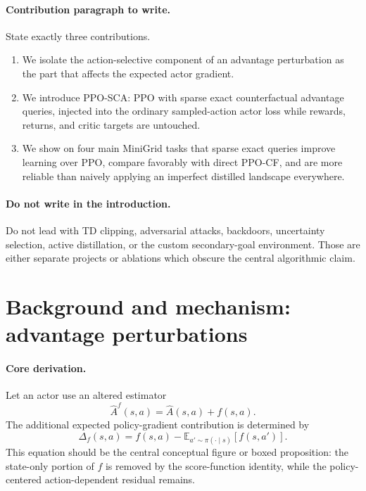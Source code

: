 \documentclass[11pt]{article}
\newcommand{\ppocf}{\textsc{PPO-CF}}
\newcommand{\pposca}{\textsc{PPO-SCA}}
\begin{document}
\paragraph{Contribution paragraph to write.}
State exactly three contributions.
\begin{enumerate}[leftmargin=1.6em]
  \item We isolate the action-selective component of an advantage perturbation
  as the part that affects the expected actor gradient.
  \item We introduce \pposca{}: PPO with sparse exact counterfactual advantage
  queries, injected into the ordinary sampled-action actor loss while rewards,
  returns, and critic targets are untouched.
  \item We show on four main MiniGrid tasks that sparse exact queries improve
  learning over PPO, compare favorably with direct \ppocf{}, and are more
  reliable than naively applying an imperfect distilled landscape everywhere.
\end{enumerate}

\paragraph{Do not write in the introduction.}
Do not lead with TD clipping, adversarial attacks, backdoors, uncertainty
selection, active distillation, or the custom secondary-goal environment.
Those are either separate projects or ablations which obscure the central
algorithmic claim.

\section{Background and mechanism: advantage perturbations}
\label{sec:mechanism}

\paragraph{Core derivation.}
Let an actor use an altered estimator
\begin{equation}
  \widehat A^f(s,a) = \widehat A(s,a) + f(s,a).
\end{equation}
The additional expected policy-gradient contribution is determined by
\begin{equation}
  \Delta_f(s,a)
  = f(s,a) - \mathbb{E}_{a'\sim\pi(\cdot\mid s)}[f(s,a')].
  \label{eq:centered-residual}
\end{equation}
This equation should be the central conceptual figure or boxed proposition:
the state-only portion of $f$ is removed by the score-function identity, while
the policy-centered action-dependent residual remains.
\end{document}
